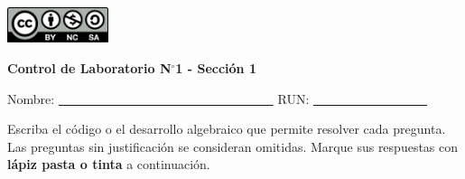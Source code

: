 \documentclass[11pt,oneside,spanish]{article}
\theoremstyle{definition}
\theoremstyle{definition}\newtheorem{definicion}{Definicin}
\theoremstyle{definition}\newtheorem{ejemplo}{Ejemplo}
\theoremstyle{remark}\newtheorem{nota}{\textsc{Nota}}
\theoremstyle{definition}\newtheorem{proposicion}{Proposicin}
\theoremstyle{definition}\newtheorem{problema}{Problema}
\begin{document}
\thispagestyle{fancy}

\includegraphics[width=8em]{by-nc-sa.pdf}

\begin{center}
\textbf{Control de Laboratorio N$^\circ$1  - Secci\'on 1} 
\end{center}

\bigskip

Nombre: \underline{\textcolor{white}{---------------------------------------------------}} \hspace{2mm} RUN: \underline{\textcolor{white}{---------------------------}}

\bigskip

Escriba el c\'odigo o el desarrollo algebraico que permite resolver cada pregunta. Las preguntas sin justificaci\'on se consideran omitidas. Marque sus respuestas con \textbf{l\'apiz pasta o tinta} a continuaci\'on.

\bigskip


\newpage
\end{document}
